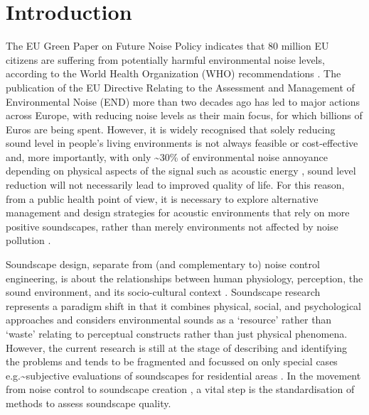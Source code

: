\documentclass[
  authoryear,
  3p]{elsarticle}
\begin{document}


\section{Introduction}\label{sec-introduction}

The EU Green Paper on Future Noise Policy indicates that 80 million EU
citizens are suffering from potentially harmful environmental noise
levels, according to the World Health Organization (WHO) recommendations
\citep{Berglund1999Guidelines}. The publication of the EU Directive
Relating to the Assessment and Management of Environmental Noise (END)
\citep{EuropeanUnion2002Directive} more than two decades ago has led to
major actions across Europe, with reducing noise levels as their main
focus, for which billions of Euros are being spent. However, it is
widely recognised that solely reducing sound level in people's living
environments is not always feasible or cost-effective and, more
importantly, with only \textasciitilde30\% of environmental noise
annoyance depending on physical aspects of the signal such as acoustic
energy \citep{Guski1997Psychological}, sound level reduction will not
necessarily lead to improved quality of life. For this reason, from a
public health point of view, it is necessary to explore alternative
management and design strategies for acoustic environments that rely on
more positive soundscapes, rather than merely environments not affected
by noise pollution
\citep{Aletta2018Associations, Kang2023Soundscape, Kang2023Supportive}.

Soundscape design, separate from (and complementary to) noise control
engineering, is about the relationships between human physiology,
perception, the sound environment, and its socio-cultural context
\citep{Kang2006Urban}. Soundscape research represents a paradigm shift
in that it combines physical, social, and psychological approaches and
considers environmental sounds as a `resource' rather than `waste'
\citep{Kang2016Soundscape} relating to perceptual constructs rather than
just physical phenomena. However, the current research is still at the
stage of describing and identifying the problems and tends to be
fragmented and focussed on only special cases
e.g.\textasciitilde subjective evaluations of soundscapes for
residential areas
\citep{SchulteFortkamp2013Introduction, Chen2023Natural}. In the
movement from noise control to soundscape creation
\citep{Aletta2015Soundscape}, a vital step is the standardisation of
methods to assess soundscape quality.
\end{document}
